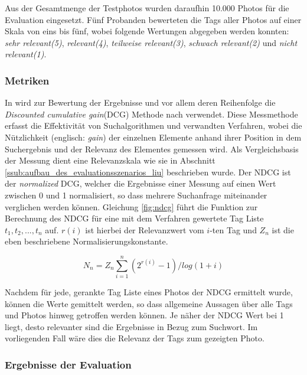 Aus der Gesamtmenge der Testphotos wurden daraufhin 10.000 Photos für die Evaluation eingesetzt. Fünf Probanden bewerteten die Tags aller Photos auf einer Skala von eins bis fünf, wobei folgende Wertungen abgegeben werden konnten: \emph{sehr relevant(5)}, \emph{relevant(4)}, \emph{teilweise relevant(3)}, \emph{schwach relevant(2)} und \emph{nicht relevant(1)}.

\subsubsection{Metriken} %
\label{ssub:metriken_liu}

In \cite{ranking} wird zur Bewertung der Ergebnisse und vor allem deren Reihenfolge die \emph{Discounted cumulative gain}(DCG) Methode nach \cite{ndcg} verwendet. Diese Messmethode erfasst die Effektivität von Suchalgorithmen und verwandten Verfahren, wobei die Nützlichkeit (englisch: \emph{gain}) der einzelnen Elemente anhand ihrer Position in dem Suchergebnis und der Relevanz des Elementes gemessen wird. Als Vergleichsbasis der Messung dient eine Relevanzskala wie sie in Abschnitt \ref{ssub:aufbau_des_evaluationsszenarios_liu} beschrieben wurde. Der NDCG ist der \emph{normalized} DCG, welcher die Ergebnisse einer Messung auf einen Wert zwischen 0 und 1 normalisiert, so dass mehrere Suchanfrage miteinander verglichen werden können. Gleichung \ref{fig:ndcg} führt die Funktion zur Berechnung des NDCG für eine mit dem Verfahren gewertete Tag Liste $t_1, t_2, ..., t_n$ auf. $r(i)$ ist hierbei der Relevanzwert vom $i$-ten Tag und $Z_n$ ist die eben beschriebene Normalisierungskonstante.
\begin{figure}[hptb]
  \begin{equation}
  \label{fig:ndcg}
    N_n = Z_n \sum_{i=1}^n(2^{r(i)} - 1) / log(1+i)
  \end{equation}
\end{figure}

Nachdem für jede, gerankte Tag Liste eines Photos der NDCG ermittelt wurde, können die Werte gemittelt werden, so dass allgemeine Aussagen über alle Tags und Photos hinweg getroffen werden können. Je näher der NDCG Wert bei 1 liegt, desto relevanter sind die Ergebnisse in Bezug zum Suchwort. Im vorliegenden Fall wäre dies die Relevanz der Tags zum gezeigten Photo.

\subsubsection{Ergebnisse der Evaluation} %
\label{ssub:ergebnisse_der_evaluation_liu}

